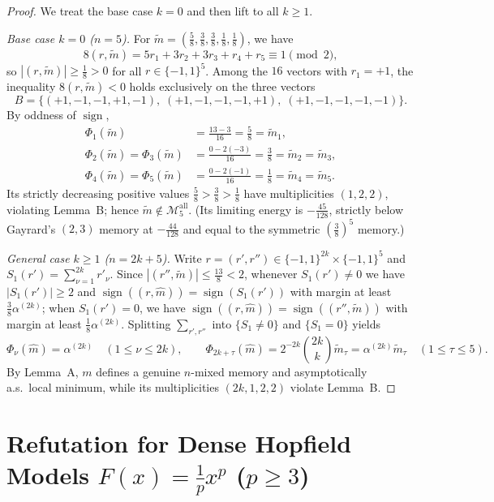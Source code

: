 \documentclass[11pt]{article}
\theoremstyle{definition}
\theoremstyle{remark}
\DeclareMathOperator{\sign}{sign}
\begin{document}
\begin{proof}
We treat the base case $k = 0$ and then lift to all $k \ge 1$.

\emph{Base case $k = 0$ ($n = 5$).} For $\tilde{m} = (\frac{5}{8}, \frac{3}{8}, \frac{3}{8}, \frac{1}{8}, \frac{1}{8})$, we have
\[
  8(r, \tilde{m}) = 5r_1 + 3r_2 + 3r_3 + r_4 + r_5 \equiv 1 \pmod{2},
\]
so $|(r, \tilde{m})| \ge \frac{1}{8} > 0$ for all $r \in \{-1,1\}^5$. Among the $16$ vectors with $r_1 = +1$, the inequality $8(r, \tilde{m}) < 0$ holds exclusively on the three vectors
\[
  B = \bigl\{(+1,-1,-1,+1,-1),\; (+1,-1,-1,-1,+1),\; (+1,-1,-1,-1,-1)\bigr\}.
\]
By oddness of $\sign$,
\begin{align*}
  \Phi_1(\tilde{m}) &= \frac{13 - 3}{16} = \frac{5}{8} = \tilde{m}_1, \\
  \Phi_2(\tilde{m}) = \Phi_3(\tilde{m}) &= \frac{0 - 2(-3)}{16} = \frac{3}{8} = \tilde{m}_2 = \tilde{m}_3, \\
  \Phi_4(\tilde{m}) = \Phi_5(\tilde{m}) &= \frac{0 - 2(-1)}{16} = \frac{1}{8} = \tilde{m}_4 = \tilde{m}_5.
\end{align*}
Its strictly decreasing positive values $\frac{5}{8} > \frac{3}{8} > \frac{1}{8}$ have multiplicities $(1, 2, 2)$, violating Lemma~B; hence $\tilde{m} \notin \mathcal{M}_5^{\mathrm{all}}$. (Its limiting energy is $-\frac{45}{128}$, strictly below Gayrard's $(2,3)$ memory at $-\frac{44}{128}$ and equal to the symmetric $(\frac{3}{8})^5$ memory.)

\emph{General case $k \ge 1$ ($n = 2k+5$).} Write $r = (r', r'') \in \{-1,1\}^{2k} \times \{-1,1\}^5$ and $S_1(r') = \sum_{\nu=1}^{2k} r'_\nu$. Since $|(r'', \tilde{m})| \le \frac{13}{8} < 2$, whenever $S_1(r') \neq 0$ we have $|S_1(r')| \ge 2$ and $\sign((r, \hat{m})) = \sign(S_1(r'))$ with margin at least $\frac{3}{8}\alpha^{(2k)}$; when $S_1(r') = 0$, we have $\sign((r, \hat{m})) = \sign((r'', \tilde{m}))$ with margin at least $\frac{1}{8}\alpha^{(2k)}$. Splitting $\sum_{r', r''}$ into $\{S_1 \neq 0\}$ and $\{S_1 = 0\}$ yields
\[
  \Phi_\nu(\hat{m}) = \alpha^{(2k)} \quad (1 \le \nu \le 2k),
  \qquad
  \Phi_{2k+\tau}(\hat{m}) = 2^{-2k}\binom{2k}{k}\tilde{m}_\tau = \alpha^{(2k)}\tilde{m}_\tau \quad (1 \le \tau \le 5).
\]
By Lemma~A, $m$ defines a genuine $n$-mixed memory and asymptotically a.s.\ local minimum, while its multiplicities $(2k, 1, 2, 2)$ violate Lemma~B.
\end{proof}

\section{Refutation for Dense Hopfield Models \texorpdfstring{$F(x) = \frac{1}{p}x^p$}{F(x) = x\textasciicircum p/p} (\texorpdfstring{$p \ge 3$}{p >= 3})}
\end{document}
